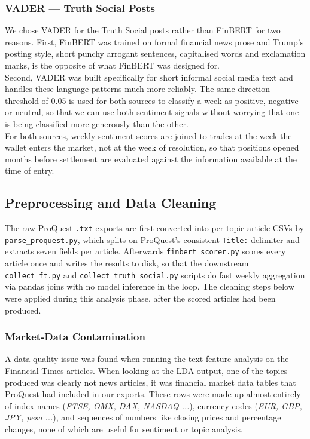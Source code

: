 \documentclass[11pt,a4paper]{article}
\begin{document}
\subsubsection*{VADER --- Truth Social Posts}

We chose VADER for the Truth Social posts rather than FinBERT for two 
reasons. First, FinBERT was trained on formal financial news prose and 
Trump's posting style, short punchy arrogant sentences, capitalised words and 
exclamation marks, is the opposite of what FinBERT was designed for. \\

Second, VADER was built specifically for short informal social media text 
and handles these language patterns much more reliably. The same direction 
threshold of 0.05 is used for both sources to classify a week as positive, 
negative or neutral, so that we can use both sentiment signals without worrying that one is being classified more generously than the other.\\

For both sources, weekly sentiment scores are joined to trades at
the week the wallet enters the market, not at the week of
resolution, so that positions opened months before settlement are
evaluated against the information available at the time of entry.

\subsection{Preprocessing and Data Cleaning}

The raw ProQuest \texttt{.txt} exports are first converted into
per-topic article CSVs by \texttt{parse\_proquest.py}, which splits
on ProQuest's consistent \texttt{Title:} delimiter and extracts
seven fields per article. Afterwards \texttt{finbert\_scorer.py} scores
every article once and writes the results to disk, so that the
downstream \texttt{collect\_ft.py} and
\texttt{collect\_truth\_social.py} scripts do fast weekly
aggregation via pandas joins with no model inference in the loop.
The cleaning steps below were applied during this analysis phase,
after the scored articles had been produced.

\subsubsection*{Market-Data Contamination}

A data quality issue was found when running the text feature analysis on the 
Financial Times articles. When looking at the LDA output, one of the topics produced was clearly not news articles, it was financial market data tables that ProQuest had included in our exports. These 
rows were made up almost entirely of index names (\textit{FTSE, OMX, DAX, 
NASDAQ ...}), currency codes (\textit{EUR, GBP, JPY, peso ...}), and sequences 
of numbers like closing prices and percentage changes, none of which are 
useful for sentiment or topic analysis.\\
\end{document}
